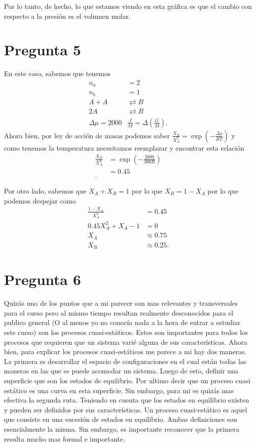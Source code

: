 \documentclass{report}
\begin{document}
Por lo tanto, de hecho, lo que estamos viendo en esta gráfica es que el cambio con respecto a la presión es  el volumen molar.
\chapter{Pregunta 5}

En este caso, sabemos que tenemos
\begin{align*}
  n_a &= 2 \\
  n_b &= 1 \\
  A+A &\rightleftarrows  B \\
  2A &\rightleftarrows B\\
  \Delta \mu = 2000 &\frac{J}{M} = \Delta \left( \frac{G}{M} \right) 
.\end{align*}
Ahora bien, por ley de acción de masas podemos saber $\frac{X_B}{X_A^2}=\exp\left( -\frac{\Delta\mu}{RT} \right) $ y  como tenemos la temperatura necesitamos reemplazar y encontrar esta relación
\begin{align*}
  \frac{X_B}{X_A^2}&=\exp\left( -\frac{2000}{300R} \right) \\
  &= 0.45 \\
.\end{align*}

Por otro lado, sabemos que $X_A + X_B = 1$ por lo que  $X_B = 1 - X_A$ por lo que podemos despejar como
 \begin{align*}
   \frac{1-X_A}{X_A^2}&= 0.45 \\
   0.45X_A^2 + X_A - 1 &= 0 \\
   X_A &\approx 0.75 \\
   X_B &\approx 0.25
.\end{align*}
\chapter{Pregunta 6}

Quizás uno de los puntos que a mi parecer son mas relevantes y transversales para el curso pero al mismo tiempo resultan realmente desconocidos para el publico general (O al menos yo no conocía nada a la hora de entrar a estudiar este curso) son los procesos cuasi-estáticos. Estos son importantes para todos los procesos que requieren que un sistema varié alguna de sus características. Ahora bien, para explicar los  procesos cuasi-estáticos me parece a mi hay dos maneras. La primera es desarrollar el espacio de configuraciones en el cual están todas las maneras en las que se puede acomodar un sistema. Luego de esto, definir una superficie que son los estados de equilibrio. Por ultimo decir que un proceso cuasi estático es una curva en esta superficie. Sin embargo, para mi es quizás mas efectiva la segunda ruta. Teniendo en cuenta que los estados en equilibrio existen y pueden ser definidos por sus características. Un proceso cuasi-estático es aquel que consiste en una sucesión de estados en equilibrio. Ambas definiciones son esencialmente la misma. Sin embargo, es importante reconocer que la primera resulta mucho mas formal e importante.
\end{document}

